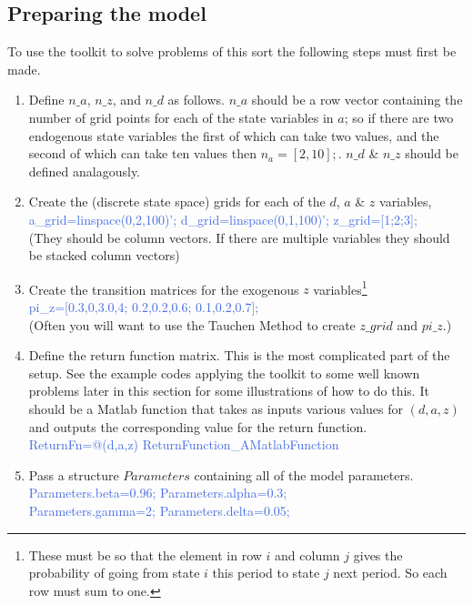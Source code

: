 \subsection{Preparing the model}
To use the toolkit to solve problems of this sort the following steps must first be made.
\begin{enumerate}
 \item Define $n\_{}a$, $n\_{}z$, and $n\_{}d$ as follows. $n\_{}a$ should be a row vector containing the number of grid points for each of the state variables in $a$;
     so if there are two endogenous state variables the first of which can take two values, and the second of which can take ten values then $n_a=[2,10];$.
     $n\_{}d$ \& $n\_{}z$ should be defined analagously.
 \item Create the (discrete state space) grids for each of the $d$, $a$ \& $z$ variables, \\
    \textcolor{RoyalBlue}{a\_{}grid=linspace(0,2,100)'; d\_{}grid=linspace(0,1,100)'; z\_{}grid=[1;2;3];} \\
       (They should be column vectors. If there are multiple variables they should be stacked column vectors)
 \item Create the transition matrices for the exogenous $z$ variables\footnote{These must be so that the element in row $i$ and column
     $j$ gives the probability of going from state $i$ this period to state $j$ next period. So each row must sum to one.} \\
     \textcolor{RoyalBlue}{pi\_{}z=[0.3,0,3.0,4; 0.2,0.2,0.6; 0.1,0.2,0.7];} \\
     (Often you will want to use the Tauchen Method to create $z\_{}grid$ and $pi\_{}z$.)
 \item Define the return function matrix. This is the most complicated part of the setup. See the example codes applying the toolkit to some well known problems
     later in this section for some illustrations of how to do this. It should be a Matlab function that takes as inputs various values for $(d,a,z)$
     and outputs the corresponding value for the return function.\\
     \textcolor{RoyalBlue}{ReturnFn=@(d,a,z) ReturnFunction\_{}AMatlabFunction}
 \item Pass a structure $Parameters$ containing all of the model parameters. \\
     \textcolor{RoyalBlue}{Parameters.beta=0.96; Parameters.alpha=0.3;} \\
     \textcolor{RoyalBlue}{Parameters.gamma=2; Parameters.delta=0.05;}

\end{enumerate}
